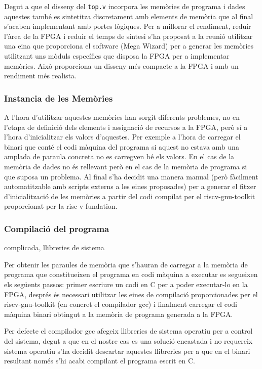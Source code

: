 \documentclass[conference,onecolumn, catalan]{IEEEtran}
\begin{document}
Degut a que el disseny del \verb|top.v| incorpora les memòries de programa i dades aquestes també es sintetitza discretament amb elements de memòria que al final s'acaben implementant amb portes lògiques. Per a millorar el rendiment, reduir l'àrea de la FPGA i reduir el temps de síntesi s'ha proposat a la reunió utilitzar una eina que proporciona el software (Mega Wizard) per a generar les memòries utilitzant uns mòduls específics que disposa la FPGA per a implementar memòries. Això proporciona un disseny més compacte a la FPGA i amb un rendiment més realista.

\subsubsection{Instancia de les Memòries}

A l'hora d'utilitzar aquestes memòries han sorgit diferents problemes, no en l'etapa de definició dels elements i assignació de recursos a la FPGA, però sí a l'hora d'inicialitzar els valors d'aquestes. Per exemple a l'hora de carregar el binari que conté el codi màquina del programa si aquest no estava amb una amplada de paraula concreta no es carregven bé els valors. En el cas de la memòria de dades no és rellevant però en el cas de la memòria de programa si que suposa un problema. Al final s'ha decidit una manera manual (però fàcilment automatitzable amb scripts externs a les eines proposades) per a generar el fitxer d'inicialització de les memòries a partir del codi compilat per el riscv-gnu-toolkit proporcionat per la risc-v fundation.

\subsubsection{Compilació del programa} complicada, llibreries de sistema

Per obtenir les paraules de memòria que s'hauran de carregar a la memòria de programa que constitueixen el programa en codi màquina a executar es segueixen els següents passos: primer escriure un codi en C per a poder executar-lo en la FPGA, després és necessari utilitzar les eines de compilació proporcionades per el riscv-gnu-toolkit (en concret el compilador gcc) i finalment carregar el codi màquina binari obtingut a la memòria de programa generada a la FPGA. 

Per defecte el compilador gcc afegeix llibreries de sistema operatiu per a control del sistema, degut a que en el nostre cas es una solució encastada i no requereix sistema operatiu s'ha decidit descartar aquestes llibreries per a que en el binari resultant només s'hi acabi compilant el programa escrit en C.
\end{document}
